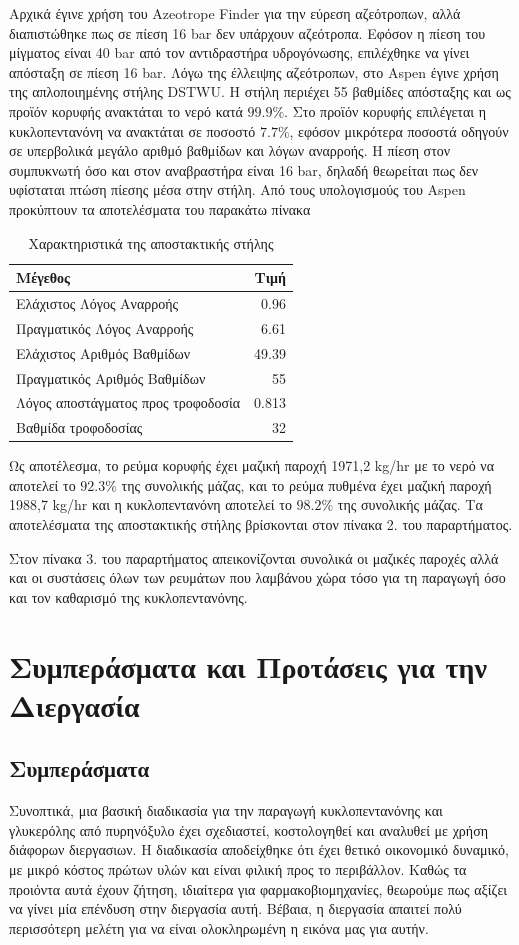 \documentclass[11pt]{article}
\begin{document}
Αρχικά έγινε χρήση του Azeotrope Finder για την εύρεση αζεότροπων, αλλά
διαπιστώθηκε πως σε πίεση 16 bar δεν υπάρχουν αζεότροπα. Εφόσον η πίεση
του μίγματος είναι 40 bar από τον αντιδραστήρα υδρογόνωσης, επιλέχθηκε
να γίνει απόσταξη σε πίεση 16 bar. Λόγω της έλλειψης αζεότροπων, στο
Aspen έγινε χρήση της απλοποιημένης στήλης DSTWU. Η στήλη περιέχει 55
βαθμίδες απόσταξης και ως προϊόν κορυφής ανακτάται το νερό κατά \(99.9 \%\).
Στο προϊόν κορυφής επιλέγεται η κυκλοπεντανόνη να ανακτάται σε ποσοστό
\(7.7 \%\), εφόσον μικρότερα ποσοστά οδηγούν σε υπερβολικά μεγάλο αριθμό
βαθμίδων και λόγων αναρροής. Η πίεση στον συμπυκνωτή όσο και στον
αναβραστήρα είναι 16 bar, δηλαδή θεωρείται πως δεν υφίσταται πτώση
πίεσης μέσα στην στήλη. Από τους υπολογισμούς του Aspen προκύπτουν τα αποτελέσματα του παρακάτω πίνακα

\begin{table}[htbp]
\caption{Χαρακτηριστικά της αποστακτικής στήλης}
\centering
\begin{tabular}{lr}
Μέγεθος & Τιμή\\
\hline
Ελάχιστος Λόγος Αναρροής & 0.96\\
Πραγματικός Λόγος Αναρροής & 6.61\\
Ελάχιστος Αριθμός Βαθμίδων & 49.39\\
Πραγματικός Αριθμός Βαθμίδων & 55\\
Λόγος αποστάγματος προς τροφοδοσία & 0.813\\
Βαθμίδα τροφοδοσίας & 32\\
\end{tabular}
\end{table}

Ως αποτέλεσμα, το ρεύμα κορυφής έχει μαζική παροχή 1971,2 kg/hr με το
νερό να αποτελεί το \(92.3 \%\) της συνολικής μάζας, και το ρεύμα πυθμένα έχει
μαζική παροχή 1988,7 kg/hr και η κυκλοπεντανόνη αποτελεί το \(98.2 \%\) της
συνολικής μάζας. Τα αποτελέσματα της αποστακτικής στήλης βρίσκονται στον
πίνακα 2. του παραρτήματος.

Στον πίνακα 3. του παραρτήματος απεικονίζονται συνολικά οι μαζικές
παροχές αλλά και οι συστάσεις όλων των ρευμάτων που λαμβάνου χώρα τόσο
για τη παραγωγή όσο και τον καθαρισμό της κυκλοπεντανόνης.

\section{Συμπεράσματα και Προτάσεις για την Διεργασία}
\label{sec:orgede18d4}
\subsection{Συμπεράσματα}
\label{sec:org929ee03}
Συνοπτικά, μια βασική διαδικασία για την παραγωγή κυκλοπεντανόνης και γλυκερόλης από πυρηνόξυλο έχει σχεδιαστεί, κοστολογηθεί και αναλυθεί με χρήση διάφορων διεργασιων. Η διαδικασία αποδείχθηκε ότι έχει θετικό οικονομικό δυναμικό, με μικρό κόστος πρώτων υλών και είναι φιλική προς το περιβάλλον. Καθώς τα προιόντα αυτά έχουν ζήτηση, ιδιαίτερα για φαρμακοβιομηχανίες, θεωρούμε πως αξίζει να γίνει μία επένδυση στην διεργασία αυτή. Βέβαια, η διεργασία απαιτεί πολύ περισσότερη μελέτη για να είναι ολοκληρωμένη η εικόνα μας για αυτήν.
\end{document}
